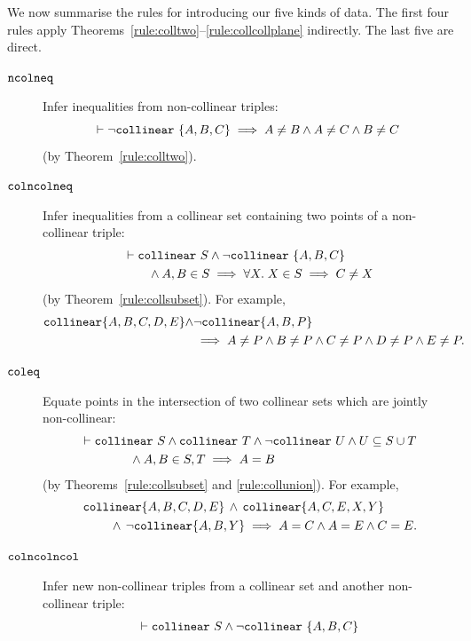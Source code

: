 We now summarise the rules for introducing our five kinds of data. The first four rules apply Theorems~\ref{rule:colltwo}--\ref{rule:collcollplane} indirectly. The last five are direct.
\begin{description}
\item[$\texttt{ncolneq}$] Infer inequalities from non-collinear triples:
\begin{displaymath}
\vdash\neg\texttt{collinear}\ \{A,B,C\} \implies A \neq B \wedge A \neq C \wedge B \neq C
\end{displaymath} (by Theorem~\ref{rule:colltwo}).
\item[$\texttt{colncolneq}$] Infer inequalities from a collinear set containing two points of a non-collinear triple:
\begin{align*}
  &\vdash\code{collinear}\ S \wedge \neg\code{collinear}\ \{A,B,C\}\\
  &\qquad\wedge A,B \in S \implies \forall X.\;X \in S \implies C \neq X
\end{align*}(by Theorem~\ref{rule:collsubset}). For example, 
\begin{align*}
\texttt{collinear} \{A, B, C, D, E\} \wedge & \neg\texttt{collinear} \{A, B, P\}\\
&\implies A \neq P \wedge B \neq P \wedge C \neq P \wedge D \neq P \wedge E \neq P.
\end{align*}
\item[$\texttt{coleq}$]\label{rule:coleq}
Equate points in the intersection of two collinear sets which are jointly non-collinear:
\begin{align*}
&\vdash\texttt{collinear}\ S \wedge \texttt{collinear}\ T \wedge \neg\texttt{collinear}\ U \wedge U \subseteq S \cup T \\
&\qquad\qquad\wedge A,B \in S,T \implies A = B
\end{align*} (by Theorems~\ref{rule:collsubset} and \ref{rule:collunion}). For example,
\begin{align*}\
&\texttt{collinear} \{A, B, C, D, E\} \,\wedge\,\texttt{collinear} \{A, C, E, X, Y\}\\ 
&\qquad\, \wedge\,\neg\texttt{collinear} \{A, B, Y\}\implies A = C \wedge A = E \wedge C = E.
\end{align*}
\item[$\texttt{colncolncol}$] Infer new non-collinear triples from a collinear set and another non-collinear triple:
\begin{align*}
  &\vdash\code{collinear}\ S \wedge \neg\code{collinear}\ \{A,B,C\}\\

\end{align*}
\end{description}
